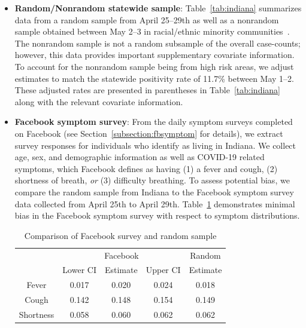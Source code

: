 \documentclass[11pt]{amsart}
\numberwithin{equation}{section}
\theoremstyle{plain}
\begin{document}
\begin{itemize}[leftmargin=*]
\item {\bf Random/Nonrandom statewide sample}: Table~\ref{tab:indiana} summarizes data from a random sample from April 25--29th as well as a nonrandom sample obtained between May 2--3 in racial/ethnic minority communities~\cite{Yiannoutsos2021}. The nonrandom sample is not a random subsample of the overall case-counts; however, this data provides important supplementary covariate information.
To account for the nonrandom sample being from high risk areas, we adjust estimates to match the statewide positivity rate of 11.7\% between May 1--2. These adjusted rates are presented in parentheses in Table~\ref{tab:indiana} along with the relevant covariate information.

\item {\bf Facebook symptom survey}: From the daily symptom surveys completed on Facebook (see Section~\ref{subsection:fbsymptom} for details), we extract survey responses for individuals who identify as living in Indiana.  We collect age, sex, and demographic information as well as COVID-19 related symptoms, which Facebook defines as having (1) a fever and cough, (2) shortness of breath, \emph{or} (3) difficulty breathing. To assess potential bias, we compare the random sample from Indiana to the Facebook symptom survey data collected from April 25th to April 29th.  Table~\ref{tab:comparison} demonstrates minimal bias in the Facebook symptom survey with respect to symptom distributions.

\begin{table}[!th]
\centering
\begin{tabular}{c | c c c | c}
& \multicolumn{3}{c}{Facebook} & Random \\ \cline{2-5}
& Lower CI & Estimate & Upper CI & Estimate \\ \hline
Fever &  0.017 & 0.020 & 0.024 & 0.018 \\
Cough &  0.142 & 0.148 & 0.154 & 0.149 \\
Shortness & 0.058 & 0.060 & 0.062 & 0.062 \\ \hline
\end{tabular}
\caption{Comparison of Facebook survey and random sample}
\label{tab:comparison}
\end{table}



\end{itemize}
\end{document}
